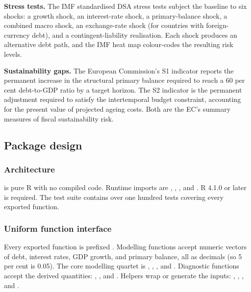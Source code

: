 \textbf{Stress tests.} The IMF standardised DSA stress tests
\citep{imf2013, imf2022} subject the baseline to six shocks: a growth
shock, an interest-rate shock, a primary-balance shock, a combined macro
shock, an exchange-rate shock (for countries with foreign-currency
debt), and a contingent-liability realisation. Each shock produces an
alternative debt path, and the IMF heat map colour-codes the resulting
risk levels.

\textbf{Sustainability gaps.} The European Commission's S1 indicator
reports the permanent increase in the structural primary balance
required to reach a 60 per cent debt-to-GDP ratio by a target horizon.
The S2 indicator is the permanent adjustment required to satisfy the
intertemporal budget constraint, accounting for the present value of
projected ageing costs. Both are the EC's summary measures of fiscal
sustainability risk.

\subsection{Package design}\label{package-design}

\subsubsection{Architecture}\label{architecture}

 is pure R with no compiled code. Runtime imports are
, , , and . R
4.1.0 or later is required. The test suite contains over one hundred
tests covering every exported function.

\subsubsection{Uniform function
interface}\label{uniform-function-interface}

Every exported function is prefixed . Modelling functions
accept numeric vectors of debt, interest rates, GDP growth, and primary
balance, all as decimals (so 5 per cent is 0.05). The core modelling
quartet is , ,
, and . Diagnostic
functions accept the derived quantities: ,
, and . Helpers wrap or
generate the inputs: , ,
, and .

